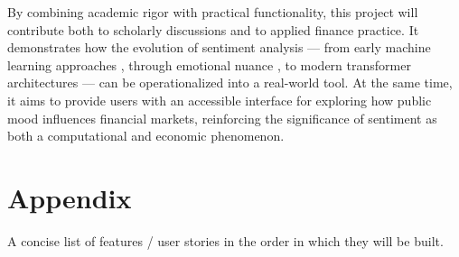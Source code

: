 \documentclass[12pt]{article}
\begin{document}
By combining academic rigor with practical functionality, this project will contribute both to scholarly
discussions and to applied finance practice. It demonstrates how the evolution of sentiment analysis —
from early machine learning approaches \cite{10.3115/1118693.1118704}, through emotional nuance
\cite{SentimentEmotionSurvey2021}, to modern transformer architectures
\cite{10.1145/3586075,10.1145/3543873.3587605} — can be operationalized into a real-world tool. At the
same time, it aims to provide users with an accessible interface for exploring how public mood
influences financial markets, reinforcing the significance of sentiment as both a computational and
economic phenomenon.

\newpage
\section*{Appendix}
A concise list of features / user stories in the order in which they will be built.
\end{document}
